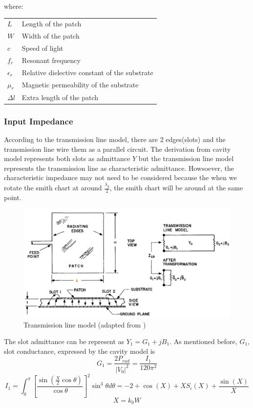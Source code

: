 \documentclass[11pt,a4paper]{article}
\makeatletter
\newenvironment{conditions}[1][where:]
  {#1 \begin{tabular}[t]{>{$}l<{$} @{${}={}$} l}}
  {\end{tabular}}
\makeatother
\begin{document}
\begin{conditions}
 		L    	 	&	Length of the patch \\
        W    	 	&	Width of the patch \\
 		c     		&	Speed of light \\   
 		f_{r} 		&	Resonant frequency \\
 		\epsilon_{r}&	Relative dielective constant of the substrate \\
        \mu_{r}		&	Magnetic permeability of the substrate \\
        \Delta l    &	Extra length of the patch \\
\end{conditions}

\subsubsection{Input Impedance}

According to the transmission line model, there are 2 edges(slots) and the transmission line wire them as a parallel circuit. The derivation from cavity model represents both slots as admittance $Y$ but the transmission line model represents the transmission line as characteristic admittance.\cite{CoB:05} Howsoever, the characteristic impedance may not need to be considered because the when we rotate the smith chart at around $\frac{\lambda_g}{2}$, the smith chart will be around at the same point.\newline

\begin{figure}[ht]
\includegraphics{tlmodel.png}
\centering
\caption{Transmission line model (adapted from \cite{CaM:81})}
\end{figure}

The slot admittance can be represent as $Y_1 = G_1 + jB_1$. As mentioned before, $G_1$, slot conductance, expressed by the cavity model is\cite{CoB:05}
\begin{equation}
    G_1 = \frac{2P_{rad}}{|V_0|^2}=\frac{I_{1}}{120\pi^2}
\end{equation}
\begin{equation}
    I_1 = \int_{0}^{\pi} \left[\frac{\sin\left(\frac{X}{2}\cos{\theta}\right)}{\cos{\theta}}\right]^2 \sin^3{\theta} d\theta = -2 + \cos(X) + XS_i(X) + \frac{\sin(X)}{X} 
\end{equation}
\begin{equation}
X = k_0W
\end{equation}
\end{document}
